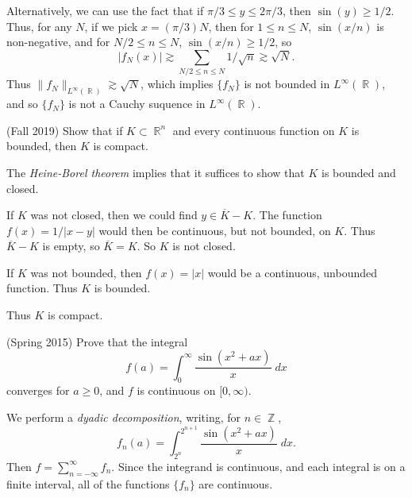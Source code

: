 \documentclass[answers]{exam}
\DeclareMathOperator{\RR}{\mathbb{R}}
\DeclareMathOperator{\ZZ}{\mathbb{Z}}
\begin{document}
\begin{questions}
\begin{parts}
\begin{solution}
		Alternatively, we can use the fact that if $\pi/3 \leq y \leq 2\pi/3$, then $\sin(y) \geq 1/2$. Thus, for any $N$, if we pick $x = (\pi/3)N$, then for $1 \leq n \leq N$, $\sin(x/n)$ is non-negative, and for $N/2 \leq n \leq N$, $\sin(x/n) \geq 1/2$, so
		\[ |f_N(x)| \gtrsim \sum_{N/2 \leq n \leq N} 1/\sqrt{n} \gtrsim \sqrt{N}. \]
		Thus $\| f_N \|_{L^\infty(\RR)} \gtrsim \sqrt{N}$, which implies $\{ f_N \}$ is not bounded in $L^\infty(\RR)$, and so $\{ f_N \}$ is not a Cauchy suquence in $L^\infty(\RR)$.
	\end{solution}
\end{parts}

\question (Fall 2019) Show that if $K \subset \RR^n$ and every continuous function on $K$ is bounded, then $K$ is compact.
\begin{solution}
	The \emph{Heine-Borel theorem} implies that it suffices to show that $K$ is bounded and closed.

	If $K$ was not closed, then we could find $y \in \overline{K} - K$. The function $f(x) = 1/|x-y|$ would then be continuous, but not bounded, on $K$. Thus $\overline{K} - K$ is empty, so $\overline{K} = K$. So $K$ is not closed.

	If $K$ was not bounded, then $f(x) = |x|$ would be a continuous, unbounded function. Thus $K$ is bounded.

	Thus $K$ is compact.
\end{solution}

\question (Spring 2015) Prove that the integral
%
\[ f(a) = \int_0^\infty \frac{\sin(x^2 + ax)}{x}\; dx \]
%
converges for $a \geq 0$, and $f$ is continuous on $[0,\infty)$.
\begin{solution}
	We perform a \emph{dyadic decomposition}, writing, for $n \in \ZZ$,
	\[ f_n(a) = \int_{2^n}^{2^{n+1}} \frac{\sin(x^2 + ax)}{x}\; dx. \]
	Then $f = \sum_{n = -\infty}^\infty f_n$. Since the integrand is continuous, and each integral is on a finite interval, all of the functions $\{ f_n \}$ are continuous.


\end{solution}
\end{questions}
\end{document}
